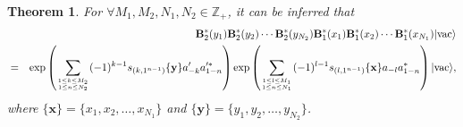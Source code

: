 \documentclass[10pt,a4paper]{amsart}
\numberwithin{equation}{section}
\newtheorem{theorem}{Theorem}[section]
\begin{document}
\begin{theorem}
For $\forall M_{1}, M_{2},N_{1}, N_{2}\in\mathbb{Z}_{+}$, it can be inferred that
\begin{eqnarray}\label{B_1_N}
&&\mathbf{B}^{\ast}_{2}(y_{1})\mathbf{B}^{\ast}_{2}(y_{2})\cdots
\mathbf{B}^{\ast}_{2}(y_{N_{2}})\mathbf{B}^{\ast}_{1}(x_{1})
\mathbf{B}^{\ast}_{1}(x_{2})\cdots\mathbf{B}^{\ast}_{1}(x_{N_{1}})|\text{vac}\rangle\notag\\
&=&\exp\left(\sum\limits_{1\leq k\leq M_{2}\atop{1\leq n\leq N_{2}}}(-1)^{k-1}s_{(k,1^{n-1})}\{\mathbf{y}\}a^{\prime}_{-k}a^{\prime\ast}_{1-n}\right)
\exp\left(\sum\limits_{1\leq l\leq M_{1}\atop{1\leq n\leq N_{1}}}(-1)^{l-1}s_{(l,1^{n-1})}\{\mathbf{x}\}a_{-l}a^{\ast}_{1-n}\right)|\text{vac}\rangle,
\notag\\
\end{eqnarray}
where $\{\mathbf{x}\}=\{x_{1},x_{2},\ldots,x_{N_{1}}\}$ and $\{\mathbf{y}\}=\{y_{1},y_{2},\ldots,y_{N_{2}}\}$.
\end{theorem}
\end{document}
